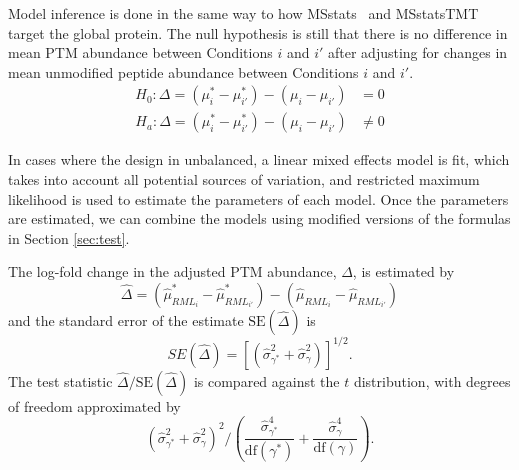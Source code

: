 \documentclass{mcp}
\begin{document}
Model inference is done in the same way to how MSstats~\cite{choi_etal_14a} and MSstatsTMT~\cite{Huang:2020} target the global protein. The null hypothesis is still that there is no difference in mean PTM abundance between Conditions $i$ and $i'$ after adjusting for changes in mean unmodified peptide abundance between Conditions $i$ and $i'$. 
\begin{align*}
H_{0}: \Delta = (\mu_{i}^{\ast} - \mu_{i'}^{\ast}) - (\mu_{i} - \mu_{i'}) &= 0 \\
H_{a}: \Delta = (\mu_{i}^{\ast} - \mu_{i'}^{\ast}) - (\mu_{i} - \mu_{i'}) &\neq 0
\end{align*}

In cases where the design in unbalanced, a linear mixed effects model is fit, which takes into account all potential sources of variation, and restricted maximum likelihood is used to estimate the parameters of each model. Once the parameters are estimated, we can combine the models using modified versions of the formulas in Section \ref{sec:test}.

The log-fold change in the adjusted PTM abundance, $\Delta$, is estimated by 
\[
\hat{\Delta} = (\hat{\mu}_{RML_i}^{\ast} - \hat{\mu}_{RML_{i'}}^{\ast}) - (\hat{\mu}_{RML_i} - \hat{\mu}_{RML_{i'}})
\]
and the standard error of the estimate $\mathrm{SE}(\hat{\Delta})$ is 
\[
SE(\hat{\Delta}) = \left[ \left( \hat{\sigma}_{\gamma^{\ast}}^{2} + \hat{\sigma}_{\gamma}^{2} \right) \right]^{1/2}.
\]
The test statistic $\hat{\Delta} / \mathrm{SE}(\hat{\Delta})$ is compared against the $t$ distribution, with degrees of freedom approximated by
\[
\left( \hat{\sigma}_{\gamma^{\ast}}^{2} + \hat{\sigma}_{\gamma}^{2} \right)^2 \bigg/
\left( \frac{\hat{\sigma}_{\gamma^{\ast}}^{4}}{\mathrm{df}(\gamma^{\ast})} + \frac{\hat{\sigma}_{\gamma}^{4}}{ \mathrm{df}(\gamma)} \right).
\]



\end{document}
